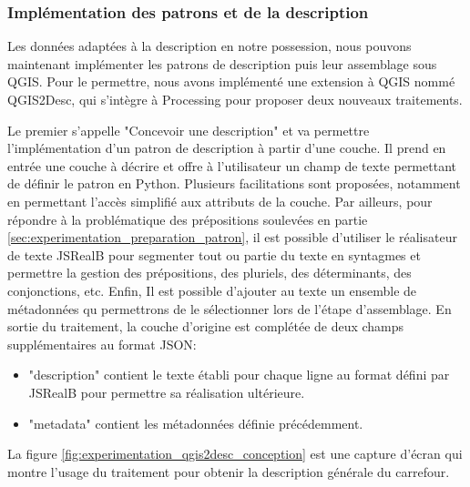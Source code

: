 \subsubsection{Implémentation des patrons et de la description}

Les données adaptées à la description en notre possession, nous pouvons maintenant implémenter les patrons de description puis leur assemblage sous QGIS. Pour le permettre, nous avons implémenté une extension à QGIS nommé QGIS2Desc, qui s'intègre à Processing pour proposer deux nouveaux traitements.

\newpar{}

Le premier s'appelle "Concevoir une description" et va permettre l'implémentation d'un patron de description à partir d'une couche. Il prend en entrée une couche à décrire et offre à l'utilisateur un champ de texte permettant de définir le patron en Python. Plusieurs facilitations sont proposées, notamment en permettant l'accès simplifié aux attributs de la couche. Par ailleurs, pour répondre à la problématique des prépositions soulevées en partie \ref{sec:experimentation_preparation_patron}, il est possible d'utiliser le réalisateur de texte JSRealB \cite{molins2015} pour segmenter tout ou partie du texte en syntagmes et permettre la gestion des prépositions, des pluriels, des déterminants, des conjonctions, etc. Enfin, Il est possible d'ajouter au texte un ensemble de métadonnées qu permettrons de le sélectionner lors de l'étape d'assemblage. En sortie du traitement, la couche d'origine est complétée de deux champs supplémentaires au format JSON:

\begin{itemize}
    \item "description" contient le texte établi pour chaque ligne au format défini par JSRealB pour permettre sa réalisation ultérieure.
    \item "metadata" contient les métadonnées définie précédemment.
\end{itemize}

La figure \ref{fig:experimentation_qgis2desc_conception} est une capture d'écran qui montre l'usage du traitement pour obtenir la description générale du carrefour.


